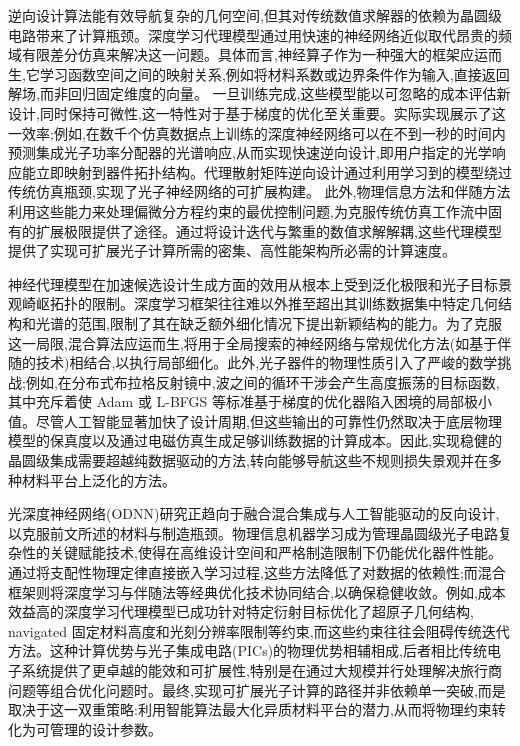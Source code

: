 逆向设计算法能有效导航复杂的几何空间,但其对传统数值求解器的依赖为晶圆级电路带来了计算瓶颈。深度学习代理模型通过用快速的神经网络近似取代昂贵的频域有限差分仿真来解决这一问题。具体而言,神经算子作为一种强大的框架应运而生,它学习函数空间之间的映射关系,例如将材料系数或边界条件作为输入,直接返回解场,而非回归固定维度的向量。\citep{doi_10_48550_arxiv_2303_10506_0452bde4} 一旦训练完成,这些模型能以可忽略的成本评估新设计,同时保持可微性,这一特性对于基于梯度的优化至关重要。实际实现展示了这一效率;例如,在数千个仿真数据点上训练的深度神经网络可以在不到一秒的时间内预测集成光子功率分配器的光谱响应,从而实现快速逆向设计,即用户指定的光学响应能立即映射到器件拓扑结构。代理散射矩阵逆向设计通过利用学习到的模型绕过传统仿真瓶颈,实现了光子神经网络的可扩展构建。\citep{s2_753a5d83a96e0194da93bcb6f20fa0bd356e37fa_c11e3796} 此外,物理信息方法和伴随方法利用这些能力来处理偏微分方程约束的最优控制问题,为克服传统仿真工作流中固有的扩展极限提供了途径。通过将设计迭代与繁重的数值求解解耦,这些代理模型提供了实现可扩展光子计算所需的密集、高性能架构所必需的计算速度。\citep{doi_10_48550_arxiv_2601_00199_c689b34d} \citep{doi_10_1038_s41598_018_37952_2_076b64f9} \citep{doi_10_48550_arxiv_2606_12337_68b62bfa}

神经代理模型在加速候选设计生成方面的效用从根本上受到泛化极限和光子目标景观崎岖拓扑的限制。深度学习框架往往难以外推至超出其训练数据集中特定几何结构和光谱的范围,限制了其在缺乏额外细化情况下提出新颖结构的能力。为了克服这一局限,混合算法应运而生,将用于全局搜索的神经网络与常规优化方法(如基于伴随的技术)相结合,以执行局部细化。此外,光子器件的物理性质引入了严峻的数学挑战;例如,在分布式布拉格反射镜中,波之间的循环干涉会产生高度振荡的目标函数,其中充斥着使 Adam 或 L-BFGS 等标准基于梯度的优化器陷入困境的局部极小值。尽管人工智能显著加快了设计周期,但这些输出的可靠性仍然取决于底层物理模型的保真度以及通过电磁仿真生成足够训练数据的计算成本。因此,实现稳健的晶圆级集成需要超越纯数据驱动的方法,转向能够导航这些不规则损失景观并在多种材料平台上泛化的方法。\citep{doi_10_1021_acsphotonics_2c00968_06a2e96b} \citep{doi_10_48550_arxiv_2602_18148_e9c0a72b} \citep{doi_10_1515_nanoph_2024_0536_4b6631ba}

光深度神经网络(ODNN)研究正趋向于融合混合集成与人工智能驱动的反向设计,以克服前文所述的材料与制造瓶颈。物理信息机器学习成为管理晶圆级光子电路复杂性的关键赋能技术,使得在高维设计空间和严格制造限制下仍能优化器件性能。通过将支配性物理定律直接嵌入学习过程,这些方法降低了对数据的依赖性;而混合框架则将深度学习与伴随法等经典优化技术协同结合,以确保稳健收敛。例如,成本效益高的深度学习代理模型已成功针对特定衍射目标优化了超原子几何结构, navigated 固定材料高度和光刻分辨率限制等约束,而这些约束往往会阻碍传统迭代方法。这种计算优势与光子集成电路(PICs)的物理优势相辅相成,后者相比传统电子系统提供了更卓越的能效和可扩展性,特别是在通过大规模并行处理解决旅行商问题等组合优化问题时。最终,实现可扩展光子计算的路径并非依赖单一突破,而是取决于这一双重策略:利用智能算法最大化异质材料平台的潜力,从而将物理约束转化为可管理的设计参数。\citep{doi_10_1109_sbfotoniopc62248_2024_10813471_692f0088} \citep{doi_10_1021_acsami_5c03196_32a62b73} \citep{doi_10_3390_nano14080697_c372a140}

